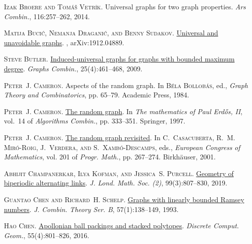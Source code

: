 \documentclass[a4paper,11pt]{article}
\theoremstyle{plain}
\theoremstyle{definition}
\begin{document}
\textsc{Izak Broere and Tom\'{a}\v{s} Vetr\'{\i}k}.
\newblock Universal graphs for two graph properties.
\newblock \emph{Ars Combin.}, 116:257--262, 2014.

\textsc{Matija Buci\'{c}, Nemanja Dragani\'{c}, and Benny Sudakov}.
\newblock \href{https://doi.org/10.1017/S0963548321000110}{Universal and
  unavoidable graphs}.
, arXiv:1912.04889.

\textsc{Steve Butler}.
\newblock \href{https://doi.org/10.1007/s00373-009-0860-x}{Induced-universal
  graphs for graphs with bounded maximum degree}.
\newblock \emph{Graphs Combin.}, 25(4):461--468, 2009.

\textsc{Peter~J. Cameron}.
\newblock Aspects of the random graph.
\newblock In \textsc{B\'ela Bollob\'as}, ed., \emph{Graph Theory and
  Combinatorics}, pp. 65--79. Academic Press, 1984.

\textsc{Peter~J. Cameron}.
\newblock \href{https://doi.org/10.1007/978-3-642-60406-5_32}{The random
  graph}.
\newblock In \emph{The mathematics of {P}aul {E}rd\H{o}s, {II}}, vol.~14 of
  \emph{Algorithms Combin.}, pp. 333--351. Springer, 1997.

\textsc{Peter~J. Cameron}.
\newblock \href{https://doi.org/10.1007/978-3-0348-8268-2_15}{The random graph
  revisited}.
\newblock In \textsc{C.~Casacuberta, R.~M. Miró-Roig, J.~Verdera, and
  S.~Xambó-Descamps}, eds., \emph{European {C}ongress of {M}athematics}, vol.
  201 of \emph{Progr. Math.}, pp. 267--274. Birkh\"{a}user, 2001.

\textsc{Abhijit Champanerkar, Ilya Kofman, and Jessica~S. Purcell}.
\newblock \href{https://doi.org/10.1112/jlms.12195}{Geometry of biperiodic
  alternating links}.
\newblock \emph{J. Lond. Math. Soc. (2)}, 99(3):807--830, 2019.

\textsc{Guantao Chen and Richard~H. Schelp}.
\newblock \href{https://doi.org/10.1006/jctb.1993.1012}{Graphs with linearly
  bounded {R}amsey numbers}.
\newblock \emph{J. Combin. Theory Ser. B}, 57(1):138--149, 1993.

\textsc{Hao Chen}.
\newblock \href{https://doi.org/10.1007/s00454-016-9777-3}{Apollonian ball
  packings and stacked polytopes}.
\newblock \emph{Discrete Comput. Geom.}, 55(4):801--826, 2016.
\end{document}
